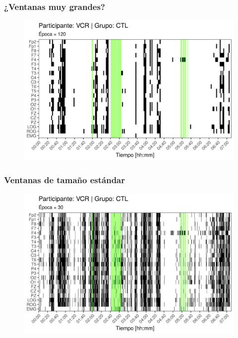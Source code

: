 \documentclass[serif,mathserif,professionalfont]{beamer}
\begin{document}

\begin{frame}\frametitle{¿Ventanas muy grandes?}
\begin{figure}
\centering
\includegraphics[width=0.9\linewidth]
{./img_art_dfa/zoom_emergencia_VCR_120.png} 
\end{figure}
\end{frame}

\begin{frame}\frametitle{Ventanas de tamaño estándar}
\begin{figure}
\centering
\includegraphics[width=0.9\linewidth]
{./img_art_dfa/zoom_emergencia_VCR_30.png} 
\end{figure}
\end{frame}
\end{document}
